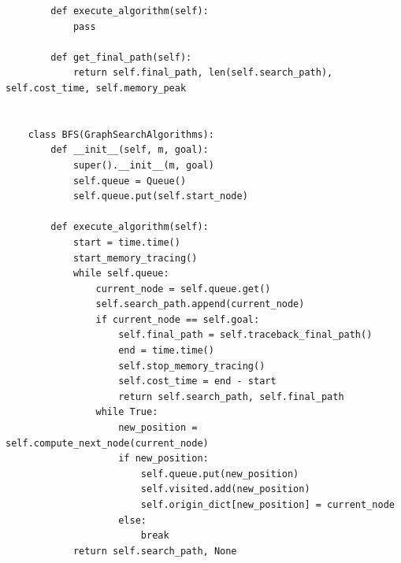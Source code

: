 \documentclass{article}
\begin{document}
\begin{lstlisting}
        def execute_algorithm(self):
            pass
    
        def get_final_path(self):
            return self.final_path, len(self.search_path), self.cost_time, self.memory_peak
    
    
    class BFS(GraphSearchAlgorithms):
        def __init__(self, m, goal):
            super().__init__(m, goal)
            self.queue = Queue()
            self.queue.put(self.start_node)
    
        def execute_algorithm(self):
            start = time.time()
            start_memory_tracing()
            while self.queue:
                current_node = self.queue.get()
                self.search_path.append(current_node)
                if current_node == self.goal:
                    self.final_path = self.traceback_final_path()
                    end = time.time()
                    self.stop_memory_tracing()
                    self.cost_time = end - start
                    return self.search_path, self.final_path
                while True:
                    new_position = self.compute_next_node(current_node)
                    if new_position:
                        self.queue.put(new_position)
                        self.visited.add(new_position)
                        self.origin_dict[new_position] = current_node
                    else:
                        break
            return self.search_path, None
\end{lstlisting}
\end{document}
